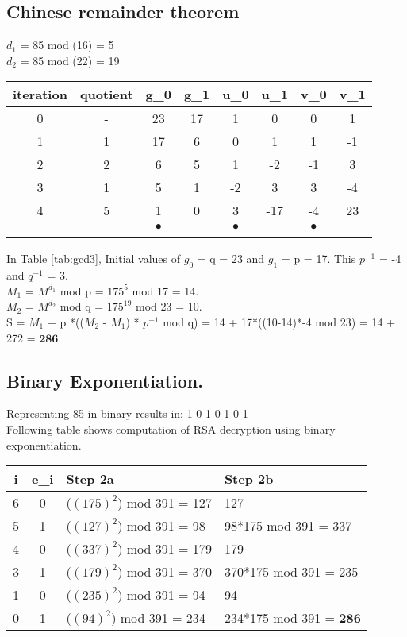 \documentclass[11pt, pdftex]{article}
\begin{document}
\subsection{Chinese remainder theorem}
$d_{1}$ = 85 mod (16) = 5\\
$d_{2}$ = 85 mod (22) = 19\\
\begin{center}
\begin{tabular}{c||c|c|c|c|c|c|c} 
iteration & quotient & g_{0} & g_{1} & u_{0} & u_{1} & v_{0} & v_{1}\\
\hline
0 & - & 23 & 17 & 1 & 0 & 0 & 1 \\
\hline
1 & 1 & 17 & 6 & 0 & 1 & 1 & -1 \\
\hline
2 & 2 & 6 & 5 & 1 & -2 & -1 & 3\\
\hline
3 & 1 & 5 & 1 & -2 & 3 & 3 & -4\\
\hline
4 & 5 & 1 & 0 & 3 & -17 & -4 & 23 \\
\hline
& & $\bullet$ & & $\bullet$ & & $\bullet$ & \\
\label{tab:gcd3}
\end{tabular}
\end{center}
In Table \ref{tab:gcd3}, Initial values of $g_{0}$ = q = 23 and $g_{1}$ = p = 17. This $p^{-1}$ = -4 and $q^{-1}$ = 3.\\
$M_{1}$ = $M^{d_{1}}$ mod p = $175^{5}$ mod 17 = 14.\\
$M_{2}$ = $M^{d_{2}}$ mod q = $175^{19}$ mod 23 = 10.\\
S = $M_{1}$ + p *(($M_{2}$ - $M_{1}$) * $p^{-1}$ mod q) = 14 + 17*((10-14)*-4 mod 23) = 14 + 272 = $\textbf{286}$.
\subsection{Binary Exponentiation.}
Representing 85 in binary results in: 1 0 1 0 1 0 1 \\
Following table shows computation of RSA decryption using binary exponentiation.
\begin{center}
\begin{tabular}{ |c|c|l|l| } 
 \hline
 i & e_{i} & Step 2a & Step 2b \\
 \hline
 \hline 
 6 & 0 & ($(175)^{2}$) mod 391 =  127 & 127 \\ 
 5 & 1 & ($(127)^{2}$) mod 391 = 98 & 98*175 mod 391 = 337 \\ 
 4 & 0 & ($(337)^{2}$) mod 391 =  179 & 179 \\
 3 & 1 & ($(179)^{2}$) mod 391 = 370 & 370*175 mod 391 = 235 \\ 
 1 & 0 & ($(235)^{2}$) mod 391 =  94 & 94 \\ 
 0 & 1 & ($(94)^{2}$) mod 391 = 234 & 234*175 mod 391 = $\textbf{286}$ \\
 \hline
\end{tabular}
\end{center}
\end{document}
